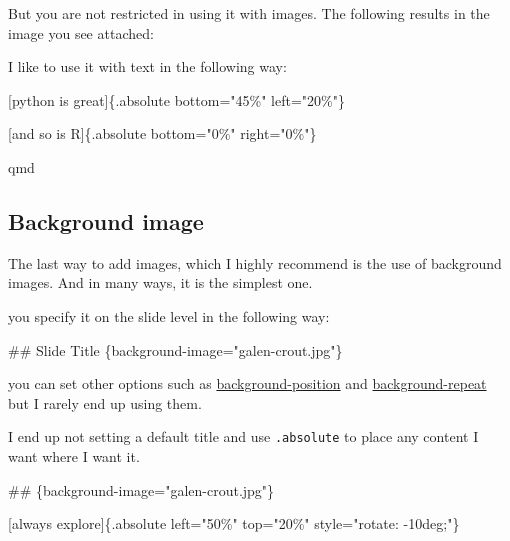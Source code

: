 \documentclass[
  letterpaper,
  DIV=11,
  numbers=noendperiod]{scrreprt}
\newenvironment{Shaded}{\begin{snugshade}}{\end{snugshade}}
\newcommand{\CommentTok}[1]{\textcolor[rgb]{0.37,0.37,0.37}{#1}}
\newcommand{\FunctionTok}[1]{\textcolor[rgb]{0.28,0.35,0.67}{#1}}
\newcommand{\NormalTok}[1]{\textcolor[rgb]{0.00,0.23,0.31}{#1}}
\newcommand{\OtherTok}[1]{\textcolor[rgb]{0.00,0.23,0.31}{#1}}
\begin{document}
But you are not restricted in using it with images. The following
results in the image you see attached:

I like to use it with text in the following way:

\begin{Shaded}
\begin{Highlighting}[]
\CommentTok{[}\OtherTok{python is great}\CommentTok{]}\NormalTok{\{.absolute bottom="45\%" left="20\%"\}}

\CommentTok{[}\OtherTok{and so is R}\CommentTok{]}\NormalTok{\{.absolute bottom="0\%" right="0\%"\}}
\end{Highlighting}
\end{Shaded}

qmd

\subsection{Background image}\label{background-image}

The last way to add images, which I highly recommend is the use of
background images. And in many ways, it is the simplest one.

you specify it on the slide level in the following way:

\begin{Shaded}
\begin{Highlighting}[]
\FunctionTok{\#\# Slide Title \{background{-}image="galen{-}crout.jpg"\}}
\end{Highlighting}
\end{Shaded}

you can set other options such as
\href{https://developer.mozilla.org/docs/Web/CSS/background-position}{background-position}
and
\href{https://developer.mozilla.org/docs/Web/CSS/background-repeat}{background-repeat}
but I rarely end up using them.

I end up not setting a default title and use \texttt{.absolute} to place
any content I want where I want it.

\begin{Shaded}
\begin{Highlighting}[]
\FunctionTok{\#\# \{background{-}image="galen{-}crout.jpg"\}}

\CommentTok{[}\OtherTok{always explore}\CommentTok{]}\NormalTok{\{.absolute left="50\%" top="20\%" style="rotate: {-}10deg;"\}}
\end{Highlighting}
\end{Shaded}
\end{document}

